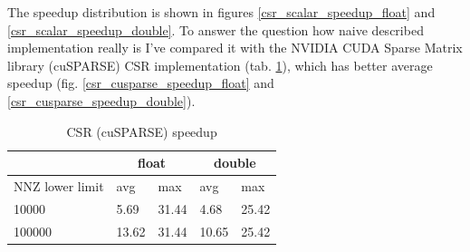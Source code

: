\documentclass{article}
\begin{document}
The speedup distribution is shown in figures \ref{csr_scalar_speedup_float} and \ref{csr_scalar_speedup_double}. To answer the question
how naive described implementation really is I've compared it with the NVIDIA CUDA Sparse Matrix library (cuSPARSE) CSR implementation
(tab. \ref{csr_cusparse_speedup_table}), which has better average speedup (fig. \ref{csr_cusparse_speedup_float} and \ref{csr_cusparse_speedup_double}). 

\begin{table}[H]
	\centering
	\begin{tabular}{ |p{2.6cm}||p{1cm}|p{1cm}|p{1cm}|p{1cm}|  }
	 \hline
		& \multicolumn{2}{|c|}{float} & \multicolumn{2}{|c|}{double}\\
	 \hline
	 NNZ lower limit & avg & max & avg & max  \\
	 \hline
	 10000  & 5.69  & 31.44 & 4.68 & 25.42 \\
	 100000 & 13.62 & 31.44 & 10.65 & 25.42 \\
	 \hline
	\end{tabular}
	\caption{CSR (cuSPARSE) speedup}
  \label{csr_cusparse_speedup_table}
\end{table}

\begin{figure}[H]
\centering
{}
\qquad %
\end{figure}
\end{document}
